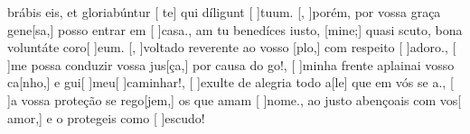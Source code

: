 {  {brábis eis, et gloriabúntur [ te] qui díligunt [ ]{tu}um.}%
    {[, ]{po}rém, por vossa graça gene[sa,] posso entrar em [ ]{ca}sa.},
  {am tu benedíces iusto, [mine;] quasi scuto, bona voluntáte coro[ ]{e}um.}%
    {[, ]{vol}tado reverente ao vosso [plo,] com respeito [ ]{a}{do}ro.},
  {}%
    {[ ]{me} possa conduzir vossa jus[ça,] por causa do go!},
  {}%
    {[ ]{mi}nha frente aplainai vosso ca[nho,] e gui[ ]{meu}[ ]{ca}minhar!},
  {}%
    {[ ]{e}xulte de alegria todo a[le] que em vós se a.},
  {}%
    {[ ]{a} vossa proteção se rego[jem,] os que amam [ ]{no}me.},
  {}%
    { ao justo abençoais com vos[ amor,] e o protegeis como [ ]{es}{cu}do!}
}